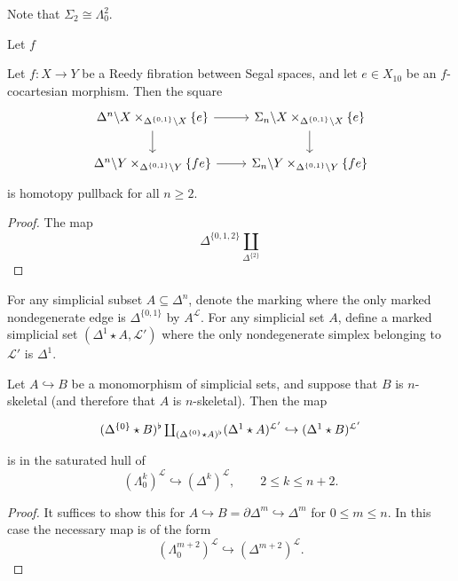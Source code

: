 \documentclass[main.tex]{subfiles}
\begin{document}
Note that $\Sigma_{2} \cong \Lambda^{2}_{0}$.

\begin{lemma}
  Let $f$
\end{lemma}

\begin{proposition}
  Let $f\colon X \to Y$ be a Reedy fibration between Segal spaces, and let $e \in X_{10}$ be an $f$-cocartesian morphism. Then the square
  \begin{equation*}
    \begin{tikzcd}
      \Delta^{n} \backslash X \times_{\Delta^{\{0, 1\}} \backslash X} \{e\}
      \arrow[r]
      \arrow[d]
      & \Sigma_{n} \backslash X \times_{\Delta^{\{0, 1\}} \backslash X} \{e\}
      \arrow[d]
      \\
      \Delta^{n} \backslash Y \times_{\Delta^{\{0, 1\}} \backslash Y} \{fe\}
      \arrow[r]
      & \Sigma_{n} \backslash Y \times_{\Delta^{\{0, 1\}} \backslash Y} \{fe\}
    \end{tikzcd}
  \end{equation*}
  is homotopy pullback for all $n \geq 2$.
\end{proposition}
\begin{proof}
  The map
  \begin{equation*}
    \Delta^{\{0,1,2\}} \coprod_{\Delta^{\{2\}}}
  \end{equation*}
\end{proof}

For any simplicial subset $A \subseteq \Delta^{n}$, denote the marking where the only marked nondegenerate edge is $\Delta^{\{0, 1\}}$ by $A^{\mathcal{L}}$. For any simplicial set $A$, define a marked simplicial set $(\Delta^{1} \star A, \mathcal{L'})$ where the only nondegenerate simplex belonging to $\mathcal{L'}$ is $\Delta^{1}$.

\begin{lemma}
  Let $A \hookrightarrow B$ be a monomorphism of simplicial sets, and suppose that $B$ is $n$-skeletal (and therefore that $A$ is $n$-skeletal). Then the map
  \begin{equation*}
    \begin{tikzcd}
      (\Delta^{\{0\}} \star B)^{\flat} \coprod_{(\Delta^{\{0\}} \star A)^{\flat}} (\Delta^{1} \star A)^{\mathcal{L}'} \hookrightarrow (\Delta^{1} \star B)^{\mathcal{L}'}
    \end{tikzcd}
  \end{equation*}
  is in the saturated hull of
  \begin{equation*}
    (\Lambda^{k}_{0})^{\mathcal{L}} \hookrightarrow (\Delta^{k})^{\mathcal{L}},\qquad 2 \leq k \leq n+2.
  \end{equation*}
\end{lemma}
\begin{proof}
  It suffices to show this for $A \hookrightarrow B = \partial \Delta^{m} \hookrightarrow \Delta^{m}$ for $0 \leq m \leq n$. In this case the necessary map is of the form
  \begin{equation*}
    (\Lambda^{m+2}_{0})^{\mathcal{L}} \hookrightarrow (\Delta^{m+2})^{\mathcal{L}}.
  \end{equation*}
\end{proof}
\end{document}
